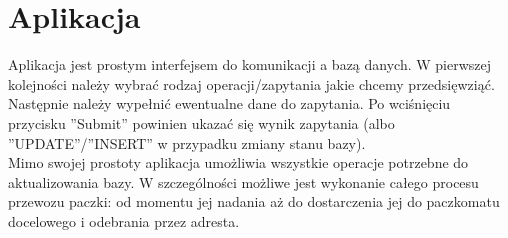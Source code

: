 \documentclass{article} %
\begin{document}
\section*{Aplikacja}
	Aplikacja jest prostym interfejsem do komunikacji a bazą danych. W pierwszej kolejności należy wybrać rodzaj operacji/zapytania jakie chcemy przedsięwziąć. Następnie należy wypełnić ewentualne dane do zapytania. Po wciśnięciu przycisku ''Submit'' powinien ukazać się wynik zapytania (albo ''UPDATE''/''INSERT'' w przypadku zmiany stanu bazy). \\ 
	Mimo swojej prostoty aplikacja umożliwia wszystkie operacje potrzebne do aktualizowania bazy. W szczególności możliwe jest wykonanie całego procesu przewozu paczki: od momentu jej nadania aż do dostarczenia jej do paczkomatu docelowego i odebrania przez adresta.
\end{document}
